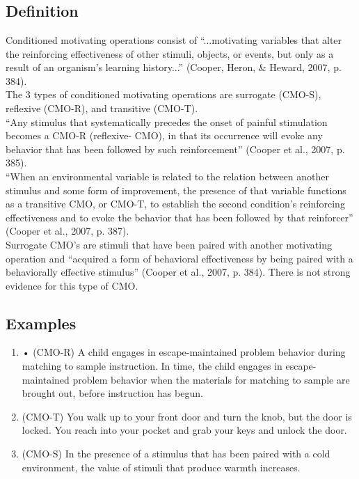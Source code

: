 %
%
%
%
%
%
%
%
%
\section[\fourFKTwentyEight{}]{\fourFKTwentyEight{}%
              }
\subsection{Definition}
Conditioned motivating operations consist of ``...motivating variables that alter the reinforcing effectiveness of other stimuli, objects, or events, but only as a result of an organism's learning history...'' (Cooper, Heron, \& Heward, 2007, p. 384).\\

The 3 types of conditioned motivating operations are surrogate (CMO-S), reflexive (CMO-R), and transitive (CMO-T).\\

``Any stimulus that systematically precedes the onset of painful stimulation becomes a CMO-R (reflexive- CMO), in that its occurrence will evoke any behavior that has been followed by such reinforcement'' (Cooper et al., 2007, p. 385).\\

``When an environmental variable is related to the relation between another stimulus and some form of improvement, the presence of that variable functions as a transitive CMO, or CMO-T, to establish the second condition's reinforcing effectiveness and to evoke the behavior that has been followed by that reinforcer'' (Cooper et al., 2007, p. 387).\\

Surrogate CMO's are stimuli that have been paired with another motivating operation and ``acquired a form of behavioral effectiveness by being paired with a behaviorally effective stimulus'' (Cooper et al., 2007, p. 384). There is not strong evidence for this type of CMO.
%
\subsection{Examples}
\begin{enumerate}
\item     • (CMO-R) A child engages in escape-maintained problem behavior during matching to sample instruction. In time, the child engages in escape-maintained problem behavior when the materials for matching to sample are brought out, before instruction has begun. 
\item (CMO-T) You walk up to your front door and turn the knob, but the door is locked. You reach into your pocket and grab your keys and unlock the door. 
\item (CMO-S) In the presence of a stimulus that has been paired with a cold environment, the value of stimuli that produce warmth increases.
%
\end{enumerate}
%
